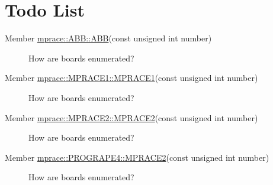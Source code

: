 \hypertarget{todo}{}\section{Todo List}\label{todo}
\label{todo__todo000001}
\hypertarget{todo__todo000001}{}
 \begin{description}
\item[Member \hyperlink{classmprace_1_1ABB_a0}{mprace::ABB::ABB}(const unsigned int number) ]How are boards enumerated? \end{description}


\label{todo__todo000002}
\hypertarget{todo__todo000002}{}
 \begin{description}
\item[Member \hyperlink{classmprace_1_1MPRACE1_a0}{mprace::MPRACE1::MPRACE1}(const unsigned int number) ]How are boards enumerated? \end{description}


\label{todo__todo000003}
\hypertarget{todo__todo000003}{}
 \begin{description}
\item[Member \hyperlink{classmprace_1_1MPRACE2_a0}{mprace::MPRACE2::MPRACE2}(const unsigned int number) ]How are boards enumerated? \end{description}


\label{todo__todo000004}
\hypertarget{todo__todo000004}{}
 \begin{description}
\item[Member \hyperlink{classmprace_1_1PROGRAPE4_a0}{mprace::PROGRAPE4::MPRACE2}(const unsigned int number) ]How are boards enumerated? \end{description}
